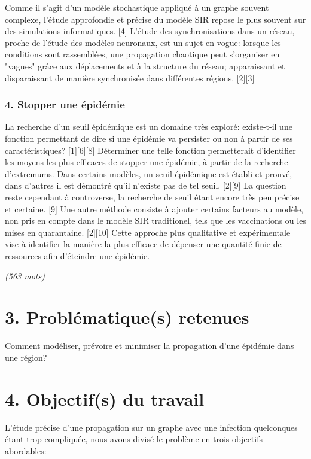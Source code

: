 \documentclass{article}
\begin{document}
Comme il s'agit d'un modèle stochastique appliqué à un graphe souvent complexe, l'étude approfondie et précise du modèle SIR repose le plus souvent sur des simulations informatiques. [4]
L'étude des synchronisations dans un réseau, proche de l'étude des modèles neuronaux, est un sujet en vogue: lorsque les conditions sont rassemblées, une propagation chaotique peut s'organiser en "vagues" grâce aux déplacements et à la structure du réseau; apparaissant et disparaissant de manière synchronisée dans différentes régions. [2][3]

\subsubsection{4. Stopper une épidémie}

La recherche d'un seuil épidémique est un domaine très exploré: existe-t-il une fonction permettant de dire si une épidémie va persister ou non à partir de ses caractéristiques? [1][6][8]
Déterminer une telle fonction permetterait d'identifier les moyens les plus efficaces de stopper une épidémie, à partir de la recherche d'extremums. Dans certains modèles, un seuil épidémique est établi et prouvé, dans d'autres il est démontré qu'il n'existe pas de tel seuil. [2][9]
La question reste cependant à controverse, la recherche de seuil étant encore très peu précise et certaine. [9]
Une autre méthode consiste à ajouter certains facteurs au modèle, non pris en compte dans le modèle SIR traditionel, tels que les vaccinations ou les mises en quarantaine. [2][10] Cette approche plus qualitative et expérimentale vise à identifier la manière la plus efficace de dépenser une quantité finie de ressources afin d'éteindre une épidémie.

\textit{(563 mots)}

\section{3. Problématique(s) retenues}

Comment modéliser, prévoire et minimiser la propagation d'une épidémie dans une région?

\section{4. Objectif(s) du travail}

L'étude précise d'une propagation sur un graphe avec une infection quelconques étant trop compliquée, nous avons divisé le problème en trois objectifs abordables:
\end{document}
